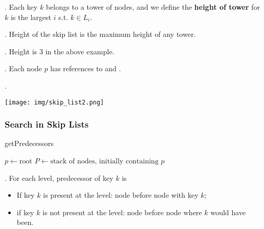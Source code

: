 \documentclass{article}
\begin{document}
\begin{deff}.
    Each key $k$ belongs to a tower of nodes, and we define the \textbf{height of tower} for $k$ is the largest $i$ s.t. $k \in L_i$. 
\end{deff}

\begin{deff}.
    Height of the skip list is the maximum height of any tower. 
    \begin{comm}[].
        Height is 3 in the above example. 
    \end{comm}
\end{deff}

\begin{codes}[].
    Each node $p$ has references to  and . 
\end{codes}

\begin{examplee}[].
    \begin{center}
        \texttt{[image: img/skip\_list2.png]}
    \end{center}
\end{examplee}

\subsubsection{Search in Skip Lists} 

\begin{algorithm}[H]
    \caption{getPredecessors}
    \SetAlgoLined
    $p \leftarrow \text{root}$\;
    $P \leftarrow \text{stack of nodes, initially containing } p$\;
\end{algorithm}

\begin{deff}.
    For each level, predecessor of key $k$ is
    \begin{itemize}
        \item If key $k$ is present at the level: node before node with key $k$; 
        \item if key $k$ is not present at the level: node before node where $k$ would have been. 
    \end{itemize}
\end{deff}
\end{document}
